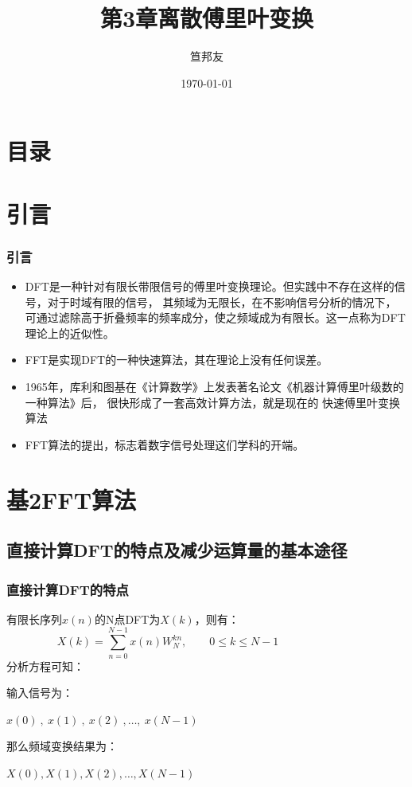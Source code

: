 \documentclass[notheorems,compress,mathserif,table]{beamer}
\title{\heiti 第3章\quad 离散傅里叶变换}
\author[\textcolor{blue}]{{\sihao\kaishu  笪邦友}}
\institute{\sihao\lishu  \textcolor{violet}{中南民族大学~~ 电子信息工程学院}}
\date{\fangsong\today}
\begin{document}
	\kaishu
	\frame{ \titlepage }
	\section*{目录}

\section{ 引言}
\begin{frame}\frametitle{引言}

\begin{itemize}

    \item DFT是一种针对有限长带限信号的傅里叶变换理论。但实践中不存在这样的信号，对于时域有限的信号，
          其频域为无限长，在不影响信号分析的情况下，可通过滤除高于折叠频率的频率成分，使之频域成为有限长。这一点称为DFT理论上的近似性。
    \item FFT是实现DFT的一种快速算法，其在理论上没有任何误差。
    \item 1965年，库利和图基在《计算数学》上发表著名论文《机器计算傅里叶级数的一种算法》后，
          很快形成了一套高效计算方法，就是现在的 快速傅里叶变换算法
    \item FFT算法的提出，标志着数字信号处理这们学科的开端。

\end{itemize}

\end{frame}

\section{ 基2FFT算法}
\subsection{直接计算DFT的特点及减少运算量的基本途径}
\begin{frame}\frametitle{直接计算DFT的特点}

    有限长序列$x(n)$的N点DFT为$X(k)$，则有：
    $$
    X(k)=\sum_{n=0}^{N-1}x(n)W_{N}^{kn},\qquad 0\leq k\leq N-1\quad\quad\quad\quad\quad\quad\quad
    $$
    分析方程可知：\par
    输入信号为：\par
    $x(0)\:,\:x(1)\:,\:x(2)\:,\ldots,\:x(N-1)$\par
    那么频域变换结果为：\par
    $X(0),X(1),X(2),\ldots,X(N-1)$\par

\end{frame}
\end{document}
